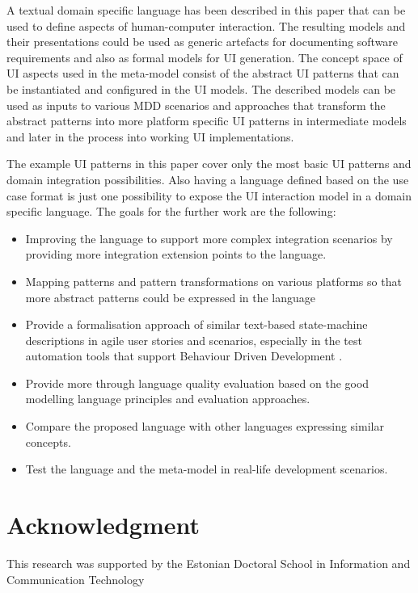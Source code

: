 \documentclass[conference]{IEEEtran}
\begin{document}
A textual domain specific language has been described in this paper that can be
used to define aspects of human-computer interaction. The resulting models and
their presentations could be used as generic artefacts for documenting software
requirements and also as formal models for UI generation. The concept space of
UI aspects used in the meta-model consist of the abstract UI patterns that can
be instantiated and configured in the UI models. The described models can be
used as inputs to various MDD scenarios and approaches that transform the
abstract patterns into more platform specific UI patterns in intermediate
models and later in the process into working UI implementations.

The example UI patterns in this paper cover only the most basic UI patterns and
domain integration possibilities. Also having a language defined based on the
use case format is just one possibility to expose the UI interaction model in a
domain specific language. The goals for the further work are the following:

\begin{itemize}
  \item Improving the language to support more complex integration scenarios by
    providing more integration extension points to the language.
  \item Mapping patterns and pattern transformations on various platforms so
    that more abstract patterns could be expressed in the language
  \item Provide a formalisation approach of similar text-based state-machine
    descriptions in agile user stories and scenarios, especially in the test
    automation tools that support Behaviour Driven Development \cite{Astels05}.
  \item Provide more through language quality evaluation based on the good
    modelling language principles and evaluation approaches.
  \item Compare the proposed language with other languages expressing similar
    concepts.
  \item Test the language and the meta-model in real-life development
    scenarios.
\end{itemize}

\section*{Acknowledgment}

This research was supported by the Estonian Doctoral School in Information and
Communication Technology



\end{document}
